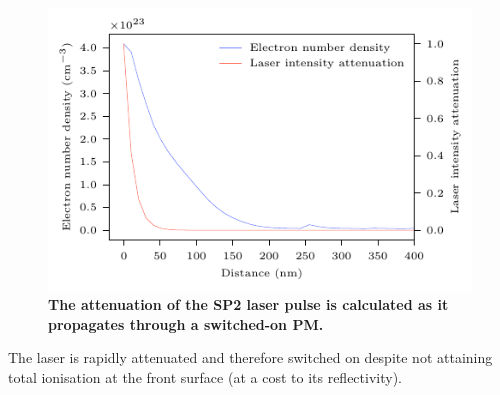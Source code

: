 \begin{figure}
	\centering
	\includegraphics{figures/orion/orion_PM_reflection}
	\caption[The attenuation of the SP2 laser pulse as it propagates through a switched-on PM.]{\textbf{The attenuation of the SP2 laser pulse is calculated as it propagates through a switched-on PM.}}
	\label{fig:orionpmreflection}
\end{figure}
The laser is rapidly attenuated and therefore switched on despite not attaining total ionisation at the front surface (at a cost to its reflectivity).

